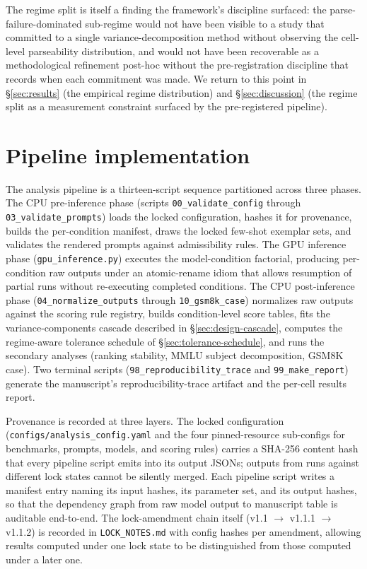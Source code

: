 \documentclass[11pt]{article}
\begin{document}
The regime split is itself a finding the framework's discipline
surfaced: the parse-failure-dominated sub-regime would not have
been visible to a study that committed to a single
variance-decomposition method without observing the cell-level
parseability distribution, and would not have been recoverable as a
methodological refinement post-hoc without the pre-registration
discipline that records when each commitment was made. We return to this point in §\ref{sec:results} (the empirical
regime distribution) and §\ref{sec:discussion} (the regime split
as a measurement constraint surfaced by the pre-registered
pipeline).

\section{Pipeline implementation}
\label{sec:pipeline}


The analysis pipeline is a thirteen-script sequence partitioned
across three phases. The CPU pre-inference phase (scripts
\texttt{00\_validate\_config} through \texttt{03\_validate\_prompts})
loads the locked configuration, hashes it for provenance, builds
the per-condition manifest, draws the locked few-shot exemplar
sets, and validates the rendered prompts against admissibility
rules. The GPU inference phase (\texttt{gpu\_inference.py}) executes
the model-condition factorial, producing per-condition raw outputs
under an atomic-rename idiom that allows resumption of partial runs
without re-executing completed conditions. The CPU post-inference
phase (\texttt{04\_normalize\_outputs} through \texttt{10\_gsm8k\_case})
normalizes raw outputs against the scoring rule registry, builds
condition-level score tables, fits the variance-components cascade
described in §\ref{sec:design-cascade}, computes the regime-aware
tolerance schedule of §\ref{sec:tolerance-schedule}, and runs the
secondary analyses (ranking stability, MMLU subject decomposition,
GSM8K case). Two terminal scripts (\texttt{98\_reproducibility\_trace}
and \texttt{99\_make\_report}) generate the manuscript's
reproducibility-trace artifact and the per-cell results report.

\begin{sloppypar}
Provenance is recorded at three layers. The locked configuration
(\texttt{configs/analysis\_config.yaml} and the four pinned-resource
sub-configs for benchmarks, prompts, models, and scoring rules)
carries a SHA-256 content hash that every pipeline script emits
into its output JSONs; outputs from runs against different lock
states cannot be silently merged. Each pipeline script writes a
manifest entry naming its input hashes, its parameter set, and its
output hashes, so that the dependency graph from raw model output
to manuscript table is auditable end-to-end. The lock-amendment
chain itself (v1.1 \(\to\) v1.1.1 \(\to\) v1.1.2) is recorded in
\texttt{LOCK\_NOTES.md} with config hashes per amendment, allowing
results computed under one lock state to be distinguished from
those computed under a later one.
\end{sloppypar}
\end{document}

